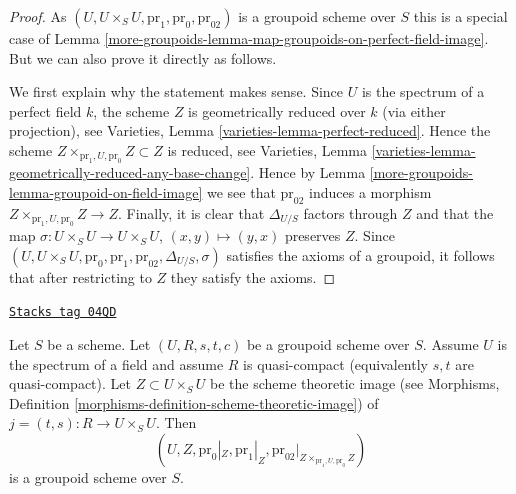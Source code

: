 \begin{proof}
As $(U, U \times_S U, \text{pr}_1, \text{pr}_0, \text{pr}_{02})$
is a groupoid scheme over $S$ this is a special case of
Lemma \ref{more-groupoids-lemma-map-groupoids-on-perfect-field-image}.
But we can also prove it directly as follows.

\medskip\noindent
We first explain why the statement makes sense. Since $U$ is the spectrum
of a perfect field $k$, the scheme $Z$ is geometrically reduced
over $k$ (via either projection), see
Varieties, Lemma \ref{varieties-lemma-perfect-reduced}.
Hence the scheme $Z \times_{\text{pr}_1, U, \text{pr}_0} Z \subset Z$
is reduced, see
Varieties, Lemma \ref{varieties-lemma-geometrically-reduced-any-base-change}.
Hence by
Lemma \ref{more-groupoids-lemma-groupoid-on-field-image}
we see that $\text{pr}_{02}$ induces a morphism
$Z \times_{\text{pr}_1, U, \text{pr}_0} Z \to Z$.
Finally, it is clear that $\Delta_{U/S}$ factors through $Z$
and that the map
$\sigma : U \times_S U \to U \times_S U$, $(x, y) \mapsto (y, x)$
preserves $Z$. Since
$(U, U \times_S U, \text{pr}_0, \text{pr}_1, \text{pr}_{02},
\Delta_{U/S}, \sigma)$
satisfies the axioms of a groupoid, it follows that after restricting
to $Z$ they satisfy the axioms.
\end{proof}

\begin{lemma}
\label{more-groupoids-lemma-quasi-compact-groupoid-on-field-image}
\href{https://stacks.math.columbia.edu/tag/04QD}{\texttt{Stacks tag 04QD}}

Let $S$ be a scheme. Let $(U, R, s, t, c)$ be a groupoid scheme
over $S$. Assume $U$ is the spectrum of a field and
assume $R$ is quasi-compact (equivalently $s, t$ are quasi-compact).
Let $Z \subset U \times_S U$ be the scheme theoretic image (see
Morphisms, Definition \ref{morphisms-definition-scheme-theoretic-image})
of $j = (t, s) : R \to U \times_S U$.
Then
$$
(U, Z, \text{pr}_0|_Z, \text{pr}_1|_Z,
\text{pr}_{02}|_{Z \times_{\text{pr}_1, U, \text{pr}_0} Z})
$$
is a groupoid scheme over $S$.
\end{lemma}

